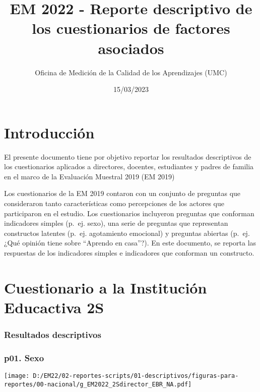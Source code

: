 \documentclass[
]{article}
\title{EM 2022 - Reporte descriptivo de los cuestionarios de factores
asociados}
\author{Oficina de Medición de la Calidad de los Aprendizajes (UMC)}
\date{15/03/2023}
\begin{document}
\maketitle

{
\setcounter{tocdepth}{3}
\tableofcontents
}
\pagebreak

\hypertarget{introducciuxf3n}{%
\section{Introducción}\label{introducciuxf3n}}

El presente documento tiene por objetivo reportar los resultados
descriptivos de los cuestionarios aplicados a directores, docentes,
estudiantes y padres de familia en el marco de la Evaluación Muestral
2019 (EM 2019)

Los cuestionarios de la EM 2019 contaron con un conjunto de preguntas
que consideraron tanto características como percepciones de los actores
que participaron en el estudio. Los cuestionarios incluyeron preguntas
que conforman indicadores simples (p.~ej. sexo), una serie de preguntas
que representan constructos latentes (p.~ej. agotamiento emocional) y
preguntas abiertas (p.~ej. ¿Qué opinión tiene sobre ``Aprendo en
casa''?). En este documento, se reporta las respuestas de los
indicadores simples e indicadores que conforman un constructo.

\pagebreak

\hypertarget{cuestionario-a-la-instituciuxf3n-educactiva-2s}{%
\section{Cuestionario a la Institución Educactiva
2S}\label{cuestionario-a-la-instituciuxf3n-educactiva-2s}}

\hypertarget{resultados-descriptivos}{%
\subsubsection{Resultados descriptivos}\label{resultados-descriptivos}}

\hypertarget{p01.-sexo}{%
\subsubsection{p01. Sexo}\label{p01.-sexo}}

\texttt{[image: D:/EM22/02-reportes-scripts/01-descriptivos/figuras-para-reportes/00-nacional/g\_EM2022\_2Sdirector\_EBR\_NA.pdf]}
\end{document}
